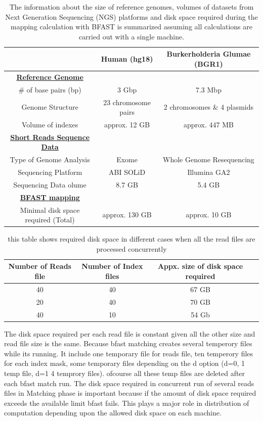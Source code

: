 \documentclass[12pt]{article}
\begin{document}
\begin{table}
\begin{tabular}{|ccc|} 
  \hline 
   & Human (hg18) & Burkerholderia Glumae (BGR1)  \\ \hline
 \underline{\textbf{Reference Genome}}   \\
    \# of base pairs (bp) &  3 Gbp & 7.3 Mbp \\
   Genome Structure &   23 chromosome pairs  & 2 chromosomes \& 4 plasmids  \\  
    Volume of indexes  & approx. 12 GB  & approx. 447 MB  \\
    \underline{ \textbf{Short Reads Sequence Data}}   \\
  Type of Genome Analysis &  Exome  & Whole Genome Resequencing \\
  Sequencing Platform & ABI SOLiD  &  Illumina GA2 \\
  Sequencing Data olume  & 8.7 GB & 5.4 GB \\
  \underline{ \textbf{BFAST mapping} }  \\
  Minimal disk space required (Total) &  approx. 130 GB   &    approx. 10 GB   \\

\hline
\end{tabular} \caption{The information about the size of reference genomes, volumes of datasets from Next Generation Sequencing (NGS) platforms and disk space required during the mapping calculation with BFAST is summarized assuming all calculations are carried out with a single machine.}
 \label{table:two-genomes} 
\end{table}



\begin{table}
 \begin{tabular}{|c|c|c|c|} 
 \hline 
Number of Reads file &  Number of Index files & Appx. size of disk space  required \\
 \hline
40 &  40 & 67 GB \\
20 & 40 & 70 GB \\
40 & 10 & 54 Gb \\ 

 \hline
 \end{tabular}
 \label{table:diskspace} 
 \caption{this table shows required disk space in different cases when all the read files are processed concurrently }
\end{table}

The disk space required per each read file is constant given all the other size and read file size is the same. Because bfast matching creates several temperory files while its running. It include one temporary file for reads file, ten temperory files for each index mask, some temporary files depending on the d option (d=0, 1 temp file, d=1 4 temprory files). ofcourse all these temp files are deleted after each bfast match run. The disk space required in concurrent run of several reads files in Matching phase is important because if the amount of disk space required exceeds the available limit bfast fails. This plays a major role in distribution of computation depending upon the allowed disk space on each machine. 
\end{document}
